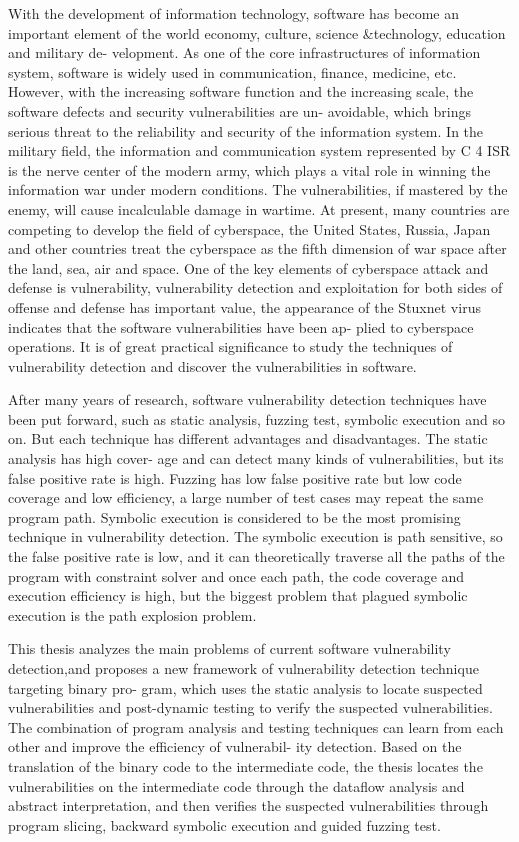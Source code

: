 \begin{eabstract}
With the development of information technology, software has become an important
element of the world economy, culture, science \&technology, education and military de-
velopment. As one of the core infrastructures of information system, software is widely
used in communication, finance, medicine, etc. However, with the increasing software
function and the increasing scale, the software defects and security vulnerabilities are un-
avoidable, which brings serious threat to the reliability and security of the information
system. In the military field, the information and communication system represented by
C 4 ISR is the nerve center of the modern army, which plays a vital role in winning the
information war under modern conditions. The vulnerabilities, if mastered by the enemy,
will cause incalculable damage in wartime. At present, many countries are competing
to develop the field of cyberspace, the United States, Russia, Japan and other countries
treat the cyberspace as the fifth dimension of war space after the land, sea, air and space.
One of the key elements of cyberspace attack and defense is vulnerability, vulnerability
detection and exploitation for both sides of offense and defense has important value, the
appearance of the Stuxnet virus indicates that the software vulnerabilities have been ap-
plied to cyberspace operations. It is of great practical significance to study the techniques
of vulnerability detection and discover the vulnerabilities in software.

After many years of research, software vulnerability detection techniques have been
put forward, such as static analysis, fuzzing test, symbolic execution and so on. But each
technique has different advantages and disadvantages. The static analysis has high cover-
age and can detect many kinds of vulnerabilities, but its false positive rate is high. Fuzzing
has low false positive rate but low code coverage and low efficiency, a large number of
test cases may repeat the same program path. Symbolic execution is considered to be
the most promising technique in vulnerability detection. The symbolic execution is path
sensitive, so the false positive rate is low, and it can theoretically traverse all the paths of
the program with constraint solver and once each path, the code coverage and execution
efficiency is high, but the biggest problem that plagued symbolic execution is the path
explosion problem.

This thesis analyzes the main problems of current software vulnerability detection,and proposes a new framework of vulnerability detection technique targeting binary pro-
gram, which uses the static analysis to locate suspected vulnerabilities and post-dynamic
testing to verify the suspected vulnerabilities. The combination of program analysis and
testing techniques can learn from each other and improve the efficiency of vulnerabil-
ity detection. Based on the translation of the binary code to the intermediate code, the
thesis locates the vulnerabilities on the intermediate code through the dataflow analysis
and abstract interpretation, and then verifies the suspected vulnerabilities through program
slicing, backward symbolic execution and guided fuzzing test.


\end{eabstract}
